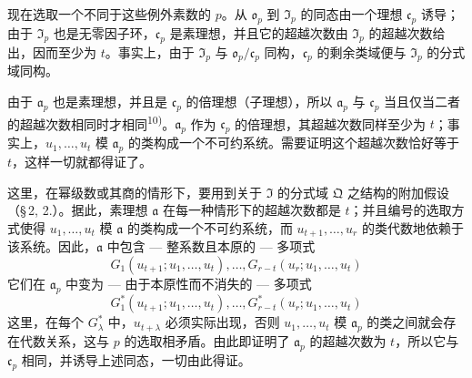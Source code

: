 现在选取一个不同于这些例外素数的 $p$。从 $\mathfrak{o}_p$ 到 $\mathfrak{I}_p$ 的同态由一个理想 $\mathfrak{c}_p$ 诱导；由于 $\mathfrak{I}_p$ 也是无零因子环，$\mathfrak{c}_p$ 是素理想，并且它的超越次数由 $\mathfrak{I}_p$ 的超越次数给出，因而至少为 $t$。事实上，由于 $\mathfrak{I}_p$ 与 $\mathfrak{o}_p/\mathfrak{c}_p$ 同构，$\mathfrak{c}_p$ 的剩余类域便与 $\mathfrak{I}_p$ 的分式域同构。

由于 $\mathfrak{a}_p$ 也是素理想，并且是 $\mathfrak{c}_p$ 的倍理想（子理想），所以 $\mathfrak{a}_p$ 与 $\mathfrak{c}_p$ 当且仅当二者的超越次数相同时才相同\textsuperscript{10)}。$\mathfrak{a}_p$ 作为 $\mathfrak{c}_p$ 的倍理想，其超越次数同样至少为 $t$；事实上，$u_1,\ldots,u_t$ 模 $\mathfrak{a}_p$ 的类构成一个不可约系统。需要证明这个超越次数恰好等于 $t$，这样一切就都得证了。

这里，在幂级数或其商的情形下，要用到关于 $\mathfrak{I}$ 的分式域 $\mathfrak{Q}$ 之结构的附加假设（\S\,2, 2.）。据此，素理想 $\mathfrak{a}$ 在每一种情形下的超越次数都是 $t$；并且编号的选取方式使得 $u_1,\ldots,u_t$ 模 $\mathfrak{a}$ 的类构成一个不可约系统，而 $u_{t+1},\ldots,u_r$ 的类代数地依赖于该系统。因此，$\mathfrak{a}$ 中包含 --- 整系数且本原的 --- 多项式
\[
G_1(u_{t+1};u_1,\ldots,u_t),\ldots,G_{r-t}(u_r;u_1,\ldots,u_t)\tag{1}
\]
它们在 $\mathfrak{a}_p$ 中变为 --- 由于本原性而不消失的 --- 多项式
\[
G^*_1(u_{t+1};u_1,\ldots,u_t),\ldots,G^*_{r-t}(u_r;u_1,\ldots,u_t)\tag{2}
\]
这里，在每个 $G^*_\lambda$ 中，$u_{t+\lambda}$ 必须实际出现，否则 $u_1,\ldots,u_t$ 模 $\mathfrak{a}_p$ 的类之间就会存在代数关系，这与 $p$ 的选取相矛盾。由此即证明了 $\mathfrak{a}_p$ 的超越次数为 $t$，所以它与 $\mathfrak{c}_p$ 相同，并诱导上述同态，一切由此得证。

